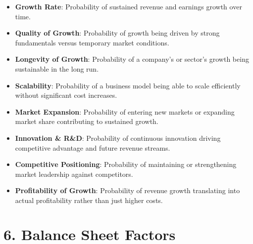 \documentclass[
]{book}
\providecommand{\tightlist}{%
  \setlength{\itemsep}{0pt}\setlength{\parskip}{0pt}}
\begin{document}
\begin{itemize}
\tightlist
\item
  \textbf{Growth Rate}: Probability of sustained revenue and earnings growth over time.\\
\item
  \textbf{Quality of Growth}: Probability of growth being driven by strong fundamentals versus temporary market conditions.\\
\item
  \textbf{Longevity of Growth}: Probability of a company's or sector's growth being sustainable in the long run.\\
\item
  \textbf{Scalability}: Probability of a business model being able to scale efficiently without significant cost increases.\\
\item
  \textbf{Market Expansion}: Probability of entering new markets or expanding market share contributing to sustained growth.\\
\item
  \textbf{Innovation \& R\&D}: Probability of continuous innovation driving competitive advantage and future revenue streams.\\
\item
  \textbf{Competitive Positioning}: Probability of maintaining or strengthening market leadership against competitors.\\
\item
  \textbf{Profitability of Growth}: Probability of revenue growth translating into actual profitability rather than just higher costs.
\end{itemize}

\section{6. Balance Sheet Factors}\label{balance-sheet-factors}
\end{document}
